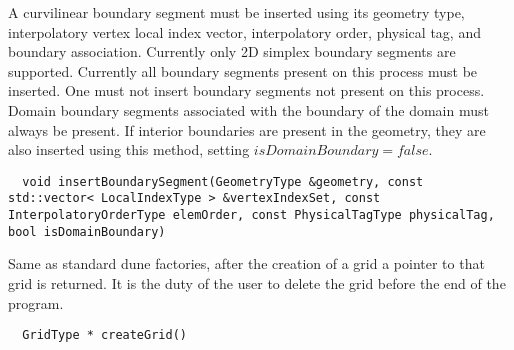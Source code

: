 \noindent
A curvilinear boundary segment must be inserted using its geometry type, interpolatory vertex local index vector, interpolatory order, physical tag, and boundary association. Currently only 2D simplex boundary segments are supported. Currently all boundary segments present on this process must be inserted. One must not insert boundary segments not present on this process. Domain boundary segments associated with the boundary of the domain must always be present. If interior boundaries are present in the geometry, they are also inserted using this method, setting $isDomainBoundary = false$. \\

\begin{mybox}
\begin{lstlisting}
  void insertBoundarySegment(GeometryType &geometry, const std::vector< LocalIndexType > &vertexIndexSet, const InterpolatoryOrderType elemOrder, const PhysicalTagType physicalTag, bool isDomainBoundary)
\end{lstlisting}
\end{mybox}


\noindent
Same as standard dune factories, after the creation of a grid a pointer to that grid is returned. It is the duty of the user to delete the grid before the end of the program.

\begin{mybox}
\begin{lstlisting}
  GridType * createGrid()
\end{lstlisting}
\end{mybox}
